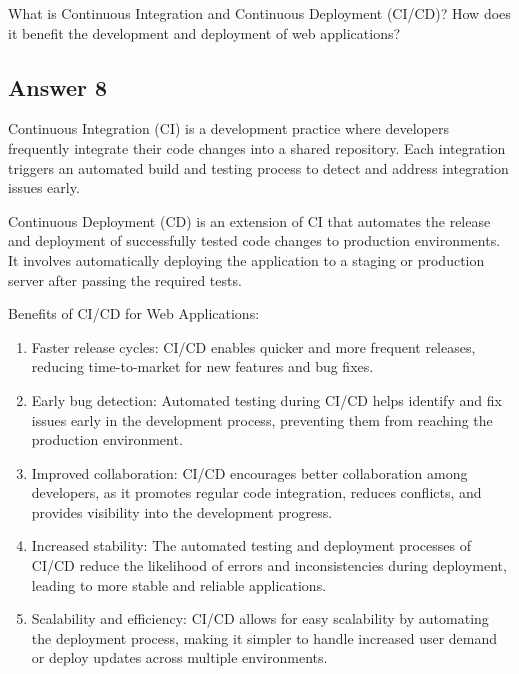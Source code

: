 \documentclass{article}
\begin{document}
What is Continuous Integration and Continuous Deployment (CI/CD)? How does it benefit the development and deployment of web applications?

\subsection*{Answer 8}
Continuous Integration (CI) is a development practice where developers frequently integrate their code changes into a shared repository. Each integration triggers an automated build and testing process to detect and address integration issues early.

Continuous Deployment (CD) is an extension of CI that automates the release and deployment of successfully tested code changes to production environments. It involves automatically deploying the application to a staging or production server after passing the required tests.

Benefits of CI/CD for Web Applications:
\begin{enumerate}
  \item Faster release cycles: CI/CD enables quicker and more frequent releases, reducing time-to-market for new features and bug fixes.
  \item Early bug detection: Automated testing during CI/CD helps identify and fix issues early in the development process, preventing them from reaching the production environment.
  \item Improved collaboration: CI/CD encourages better collaboration among developers, as it promotes regular code integration, reduces conflicts, and provides visibility into the development progress.
  \item Increased stability: The automated testing and deployment processes of CI/CD reduce the likelihood of errors and inconsistencies during deployment, leading to more stable and reliable applications.
  \item Scalability and efficiency: CI/CD allows for easy scalability by automating the deployment process, making it simpler to handle increased user demand or deploy updates across multiple environments.
\end{enumerate}
\end{document}
